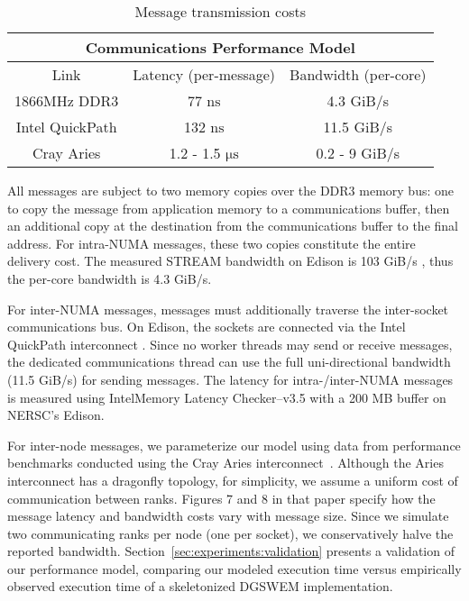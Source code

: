 \begin{table}
  \caption{Message transmission costs}
  \label{tab:comm-model}
  \footnotesize
  \begin{center}
    \begin{tabular}{|c|c|c|}
      \hline
      \multicolumn{3}{|c|}{Communications Performance Model} \\
      \hline
      Link & Latency (per-message) & Bandwidth (per-core) \\
      \hline
      1866MHz DDR3 & 77 $\mathrm{ns}$ & 4.3 GiB/s \\
      \hline
      Intel QuickPath & 132 $\mathrm{ns}$ & 11.5 GiB/s \\
      \hline
      Cray Aries & 1.2 - 1.5 $\mathrm{\mu s}$ & 0.2 - 9 GiB/s \\
      \hline
    \end{tabular}
  \end{center}
  \vspace{-5mm}
\end{table}

All messages are subject to two memory copies over the DDR3 memory bus:
one to copy the message from application memory to a communications buffer,
then an additional copy at the destination from the communications buffer to the final address.
For intra-NUMA messages, these two copies constitute the entire
delivery cost.
The measured STREAM bandwidth on Edison is 103 GiB/s
\cite{Edison}, thus the per-core bandwidth is 4.3 GiB/s.

For inter-NUMA messages, messages must additionally traverse the
inter-socket communications bus.
On Edison, the sockets are connected via the Intel QuickPath interconnect
\cite{Intel2009}.
Since no worker threads may send or receive messages, the dedicated communications
thread can use the full uni-directional bandwidth (11.5 GiB/s) for sending
messages.
The latency for intra-/inter-NUMA messages is measured using Intel\textregistered Memory Latency Checker--v3.5 with a 200 MB buffer on NERSC's Edison.

For inter-node messages, we parameterize our model using data from
performance benchmarks conducted using the
Cray Aries interconnect~\cite{Faanes2012}.
Although the Aries interconnect has a dragonfly topology, for simplicity, we
assume a uniform cost of communication between ranks.
Figures 7 and 8 in that paper specify how the message latency and
bandwidth costs vary with message size.
Since we simulate two communicating ranks per node (one
per socket), we conservatively halve the reported bandwidth.
Section~\ref{sec:experiments:validation} presents a validation of our
performance model, comparing our modeled execution time versus
empirically observed execution time of a skeletonized DGSWEM implementation.
